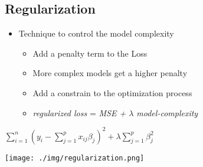 \subsection{Regularization}
\begin{itemize}
    \item Technique to control the model complexity
    \begin{itemize}
        \item Add a penalty term to the Loss
        \item More complex models get a higher penalty
        \item Add a constrain to the optimization process
        \item \textit{regularized loss} = \textit{MSE + $\lambda$ model-complexity}
    \end{itemize}
\end{itemize}
\begin{center}
    $\displaystyle\sum_{i = 1}^{n} (y_i - \displaystyle\sum_{j = 1}^{p} x_{ij}\beta_j)^2 + \lambda \displaystyle\sum_{j = 1}^{p}\beta_j^2$
\end{center}
\texttt{[image: ./img/regularization.png]}
